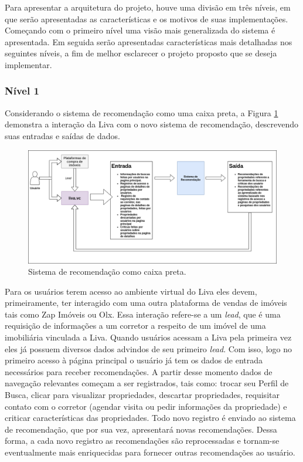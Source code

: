 Para apresentar a arquitetura do projeto, houve uma divisão em três níveis, em que serão apresentadas as características e os motivos de suas implementações. Começando com o primeiro nível uma visão mais generalizada do sistema é apresentada. Em seguida serão apresentadas características mais detalhadas nos seguintes níveis, a fim de melhor esclarecer o projeto proposto que se deseja implementar. 

\subsubsection{Nível 1}

Considerando o sistema de recomendação como uma caixa preta, a Figura \ref{fig:sr_nivel1} demonstra a interação da Liva com o novo sistema de recomendação, descrevendo suas entradas e saídas de dados.

\begin{figure}[H]
    \centering
    \includegraphics[scale=0.4]{figuras/proposta/sr_nivel1.png}
    \caption[Sistema de recomendação como caixa preta]{Sistema de recomendação como caixa preta.}
    \label{fig:sr_nivel1}
\end{figure}

Para os usuários terem acesso ao ambiente virtual do Liva eles devem, primeiramente, ter interagido com uma outra plataforma de vendas de imóveis tais como Zap Imóveis ou Olx. Essa interação refere-se a um \textit{lead}, que é uma requisição de informações  a um corretor a respeito de um imóvel de uma imobiliária vinculada a Liva. Quando usuários acessam a Liva pela primeira vez eles já possuem diversos dados advindos de seu primeiro \textit{lead}. Com isso, logo no primeiro acesso à página principal o usuário já tem os dados de entrada necessários para receber recomendações. A partir desse momento dados de navegação relevantes começam a ser registrados, tais como: trocar seu Perfil de Busca, clicar para visualizar propriedades, descartar propriedades, requisitar contato com o corretor (agendar visita ou pedir informações da propriedade) e criticar características das propriedades. Todo novo registro é enviado ao sistema de recomendação, que por sua vez, apresentará novas recomendações. Dessa forma, a cada novo registro as recomendações são reprocessadas e tornam-se eventualmente mais enriquecidas para fornecer outras recomendações ao usuário.


